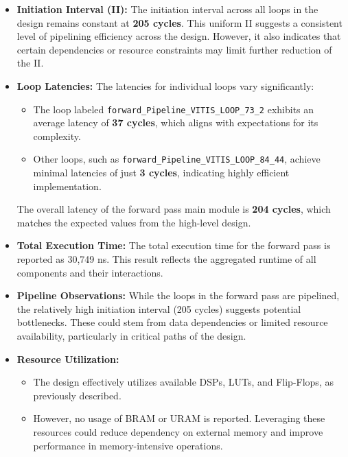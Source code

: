 \documentclass{article}
\begin{document}
\begin{itemize}
    \item \textbf{Initiation Interval (II):} The initiation interval across all loops in the design remains constant at \textbf{205 cycles}. This uniform II suggests a consistent level of pipelining efficiency across the design. However, it also indicates that certain dependencies or resource constraints may limit further reduction of the II.

    \item \textbf{Loop Latencies:} The latencies for individual loops vary significantly:
    \begin{itemize}
        \item The loop labeled \texttt{forward\_Pipeline\_VITIS\_LOOP\_73\_2} exhibits an average latency of \textbf{37 cycles}, which aligns with expectations for its complexity.
        \item Other loops, such as \texttt{forward\_Pipeline\_VITIS\_LOOP\_84\_44}, achieve minimal latencies of just \textbf{3 cycles}, indicating highly efficient implementation.
    \end{itemize}
    The overall latency of the forward pass main module is \textbf{204 cycles}, which matches the expected values from the high-level design.

    \item \textbf{Total Execution Time:} The total execution time for the forward pass is reported as 30,749 ns. This result reflects the aggregated runtime of all components and their interactions.

    \item \textbf{Pipeline Observations:} While the loops in the forward pass are pipelined, the relatively high initiation interval (205 cycles) suggests potential bottlenecks. These could stem from data dependencies or limited resource availability, particularly in critical paths of the design.

    \item \textbf{Resource Utilization:} 
    \begin{itemize}
        \item The design effectively utilizes available DSPs, LUTs, and Flip-Flops, as previously described.
        \item However, no usage of BRAM or URAM is reported. Leveraging these resources could reduce dependency on external memory and improve performance in memory-intensive operations.
    \end{itemize}
\end{itemize}
\end{document}
